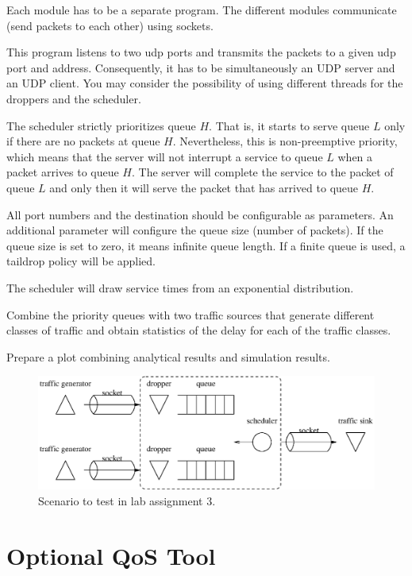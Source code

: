 Each module has to be a separate program. The different modules communicate (send packets to each other) using sockets.

This program listens to two udp ports and transmits the packets to a given udp port and address. Consequently, it has to be simultaneously an UDP server and an UDP client. You may consider the possibility of using different threads for the droppers and the scheduler.

The scheduler strictly prioritizes queue $H$.
That is, it starts to serve queue $L$ only if there are no packets at queue $H$.
Nevertheless, this is non-preemptive priority, which means that the server will not interrupt a service to queue $L$ when a packet arrives to queue $H$.
The server will complete the service to the packet of queue $L$ and only then it will serve the packet that has arrived to queue $H$.

All port numbers and the destination should be configurable as parameters. An additional parameter will configure the queue size (number of packets). If the queue size is set to zero, it means infinite queue length. If a finite queue is used, a taildrop policy will be applied.

The scheduler will draw service times from an exponential distribution.

Combine the priority queues with two traffic sources that generate different classes of traffic and obtain statistics of the delay for each of the traffic classes.

Prepare a plot combining analytical results and simulation results.

\begin{figure}[!h]
\centering
\includegraphics[width=\linewidth]{figures/scenario3.eps}
\caption{Scenario to test in lab assignment 3.}
\label{fig:scenario3}
\end{figure}

\section{Optional QoS Tool}

